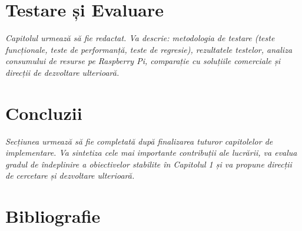 \documentclass[12pt, twoside, a4paper]{report}
\begin{document}
\chapter{Testare și Evaluare}

\textit{Capitolul urmează să fie redactat. Va descrie: metodologia de testare
(teste funcționale, teste de performanță, teste de regresie), rezultatele testelor,
analiza consumului de resurse pe Raspberry Pi, comparație cu soluțiile comerciale
și direcții de dezvoltare ulterioară.}


\chapter*{Concluzii}

\textit{Secțiunea urmează să fie completată după finalizarea tuturor capitolelor de
implementare. Va sintetiza cele mai importante contribuții ale lucrării, va evalua
gradul de îndeplinire a obiectivelor stabilite în Capitolul 1 și va propune direcții
de cercetare și dezvoltare ulterioară.}


\chapter*{Bibliografie}
\end{document}
